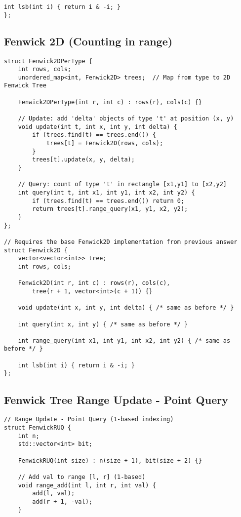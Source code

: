 \documentclass[10pt]{article}
\begin{document}
\begin{multicols*}{2}
\begin{lstlisting}[style=compactcpp]
    int lsb(int i) { return i & -i; }
};
\end{lstlisting}

\subsection{Fenwick 2D (Counting in range)}
\begin{lstlisting}[style=compactcpp]
struct Fenwick2DPerType {
    int rows, cols;
    unordered_map<int, Fenwick2D> trees;  // Map from type to 2D Fenwick Tree

    Fenwick2DPerType(int r, int c) : rows(r), cols(c) {}

    // Update: add 'delta' objects of type 't' at position (x, y)
    void update(int t, int x, int y, int delta) {
        if (trees.find(t) == trees.end()) {
            trees[t] = Fenwick2D(rows, cols);
        }
        trees[t].update(x, y, delta);
    }

    // Query: count of type 't' in rectangle [x1,y1] to [x2,y2]
    int query(int t, int x1, int y1, int x2, int y2) {
        if (trees.find(t) == trees.end()) return 0;
        return trees[t].range_query(x1, y1, x2, y2);
    }
};

// Requires the base Fenwick2D implementation from previous answer
struct Fenwick2D {
    vector<vector<int>> tree;
    int rows, cols;
    
    Fenwick2D(int r, int c) : rows(r), cols(c), 
        tree(r + 1, vector<int>(c + 1)) {}
    
    void update(int x, int y, int delta) { /* same as before */ }
    
    int query(int x, int y) { /* same as before */ }
    
    int range_query(int x1, int y1, int x2, int y2) { /* same as before */ }
    
    int lsb(int i) { return i & -i; }
};
\end{lstlisting}

\subsection{Fenwick Tree Range Update - Point Query}
\begin{lstlisting}[style=compactcpp]
// Range Update - Point Query (1-based indexing)
struct FenwickRUQ {
    int n;
    std::vector<int> bit;
    
    FenwickRUQ(int size) : n(size + 1), bit(size + 2) {}
    
    // Add val to range [l, r] (1-based)
    void range_add(int l, int r, int val) {
        add(l, val);
        add(r + 1, -val);
    }
    

\end{lstlisting}
\end{multicols*}
\end{document}
